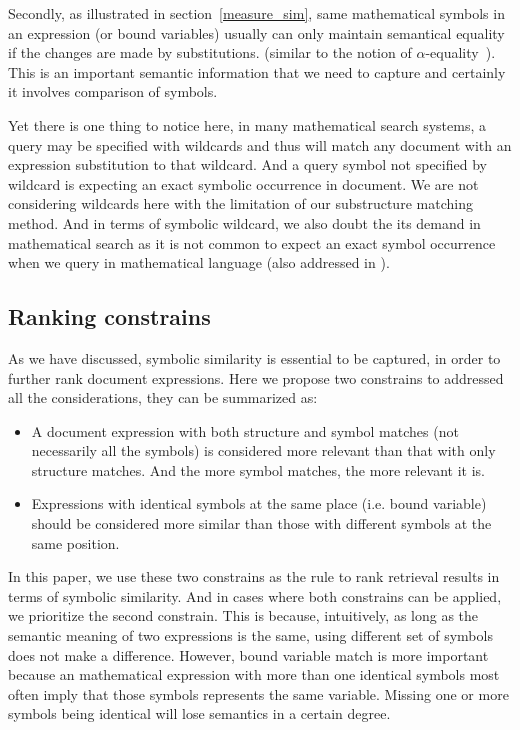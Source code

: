 Secondly, as illustrated in section~\ref{measure_sim}, same mathematical symbols in an expression (or bound variables) usually can only maintain semantical equality if the changes are made by substitutions. (similar to the notion of $\alpha$-equality~\cite{Hindley1986}). This is an important semantic information that we need to capture and certainly it involves comparison of symbols. 

Yet there is one thing to notice here, in many mathematical search systems, a query may be specified with wildcards and thus will match any document with an expression substitution to that wildcard. 
And a query symbol not specified by wildcard is expecting an exact symbolic occurrence in document.
We are not considering wildcards here with the limitation of our substructure matching method. 
And in terms of symbolic wildcard, we also doubt the its demand in mathematical search as it is not common to expect an exact symbol occurrence when we query in mathematical language (also addressed in \cite{mias11a}).

\subsection{Ranking constrains}
As we have discussed, symbolic similarity is essential to be captured, in order to further rank document expressions. 
Here we propose two constrains to addressed all the considerations, they can be summarized as:

\begin{itemize}
\item A document expression with both structure and symbol matches (not necessarily all the symbols) is considered more relevant than that with only structure matches. 
And the more symbol matches, the more relevant it is.
\item Expressions with identical symbols at the same place (i.e. bound variable) should be considered more similar than those with different symbols at the same position. 
\end{itemize}

In this paper, we use these two constrains as the rule to rank retrieval results in terms of symbolic similarity.
And in cases where both constrains can be applied, we prioritize the second constrain. 
This is because, intuitively, as long as the semantic meaning of two expressions is the same, using different set of symbols does not make a difference. 
However, bound variable match is more important because an mathematical expression with more than one identical symbols most often imply that those symbols represents the same variable. 
Missing one or more symbols being identical will lose semantics in a certain degree.

